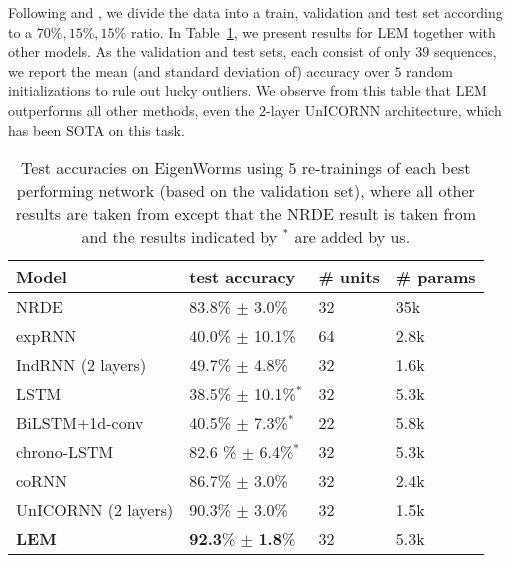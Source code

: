\documentclass{article} \usepackage{iclr2022_conference,times}
\newcommand{\Tref}[1]{Table~\ref{#1}}
\begin{document}
Following \citet{log_ode} and \cite{unicornn}, we divide the data into a train, validation and test set according to a $70\%,15\%,15\%$ ratio. In \Tref{tab:worms}, we present results for LEM together with other models. As the validation and test sets, each consist of only $39$ sequences, we report the mean (and standard deviation of) accuracy over $5$ random initializations to rule out lucky outliers. We observe from this table that LEM outperforms all other methods, even the $2$-layer UnICORNN architecture, which has been SOTA on this task. 
\begin{table}[t!]
\caption{Test accuracies on EigenWorms using $5$ re-trainings of each best performing network (based on the validation set), where all other results are taken from \citet{unicornn} except that the NRDE result is taken from \cite{log_ode} and the results indicated by $^*$ are added by us.}
\label{tab:worms}
\centering
\begin{tabular}{llll}
\toprule
\cmidrule(r){1-4}
Model &  test accuracy & \# units & \# params \\
\midrule
NRDE & 83.8\% $\pm$ 3.0\% & 32 & 35k \\
expRNN & 40.0\% $\pm$ 10.1\% & 64 & 2.8k \\
IndRNN (2 layers) & 49.7\% $\pm$ 4.8\% & 32 & 1.6k \\
LSTM & 38.5\% $\pm$ 10.1\%$^*$ & 32 & 5.3k \\
BiLSTM+1d-conv & 40.5\% $\pm$ 7.3\%$^*$ & 22 & 5.8k \\
chrono-LSTM & 82.6 \% $\pm$ 6.4\%$^*$ & 32 & 5.3k \\
coRNN & 86.7\% $\pm$ 3.0\%&32 & 2.4k \\
UnICORNN (2 layers) & 90.3\% $\pm$ 3.0\% & 32 & 1.5k\\
\textbf{LEM} & \textbf{92.3}\% $\pm$ \textbf{1.8}\% & 32 & 5.3k \\
    \bottomrule
  \end{tabular}
\end{table}
\end{document}
